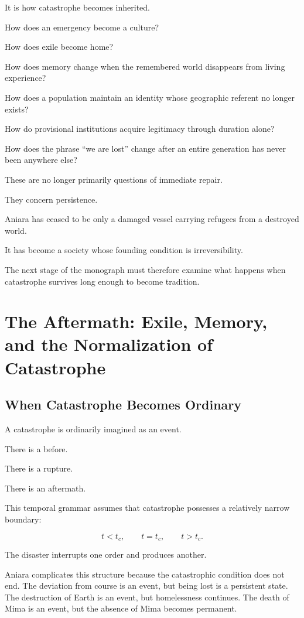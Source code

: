 \documentclass[11pt,oneside]{book}
\theoremstyle{definition}
\theoremstyle{remark}
\begin{document}
It is how catastrophe becomes inherited.

How does an emergency become a culture?

How does exile become home?

How does memory change when the remembered world disappears from living experience?

How does a population maintain an identity whose geographic referent no longer exists?

How do provisional institutions acquire legitimacy through duration alone?

How does the phrase ``we are lost'' change after an entire generation has never been anywhere else?

These are no longer primarily questions of immediate repair.

They concern persistence.

Aniara has ceased to be only a damaged vessel carrying refugees from a destroyed world.

It has become a society whose founding condition is irreversibility.

The next stage of the monograph must therefore examine what happens when catastrophe survives long enough to become tradition.

\chapter{The Aftermath: Exile, Memory, and the Normalization of Catastrophe}

\section{When Catastrophe Becomes Ordinary}

A catastrophe is ordinarily imagined as an event.

There is a before.

There is a rupture.

There is an aftermath.

This temporal grammar assumes that catastrophe possesses a relatively narrow boundary:

\[
t<t_c,
\qquad
t=t_c,
\qquad
t>t_c.
\]

The disaster interrupts one order and produces another.

Aniara complicates this structure because the catastrophic condition does not end. The deviation from course is an event, but being lost is a persistent state. The destruction of Earth is an event, but homelessness continues. The death of Mima is an event, but the absence of Mima becomes permanent.
\end{document}
